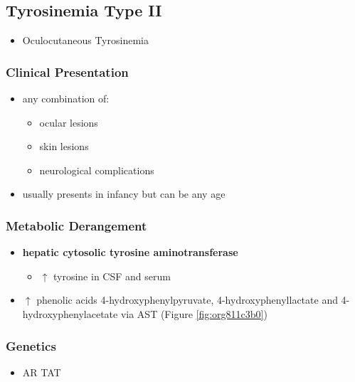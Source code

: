 \documentclass[12pt]{scrartcl}
\begin{document}
\subsection{Tyrosinemia Type II}
\label{sec:org2b452d2}
\begin{itemize}
\item Oculocutaneous Tyrosinemia
\end{itemize}
\subsubsection{Clinical Presentation}
\label{sec:org0024d7c}
\begin{itemize}
\item any combination of: 
\begin{itemize}
\item ocular lesions
\item skin lesions
\item neurological complications
\end{itemize}
\item usually presents in infancy but can be any age
\end{itemize}

\subsubsection{Metabolic Derangement}
\label{sec:orgdc771bf}
\begin{itemize}
\item \textbf{hepatic cytosolic tyrosine aminotransferase}


\begin{itemize}
\item \(\uparrow\) tyrosine in CSF and serum
\end{itemize}
\item \(\uparrow\) phenolic acids 4-hydroxyphenylpyruvate,
4-hydroxyphenyllactate and 4-hydroxyphenylacetate via AST (Figure \ref{fig:org811c3b0})
\end{itemize}

\subsubsection{Genetics}
\label{sec:org356d43c}
\begin{itemize}
\item AR TAT
\end{itemize}
\end{document}
